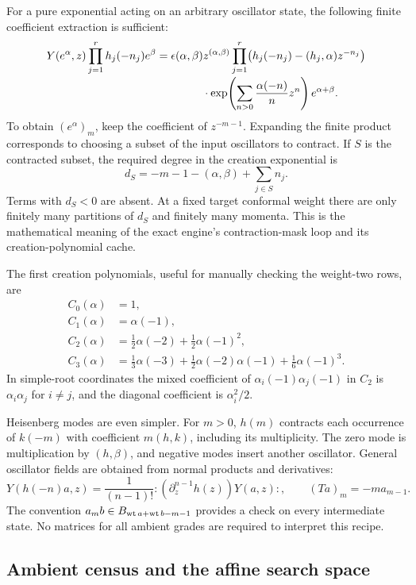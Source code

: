 For a pure exponential acting on an arbitrary oscillator state, the
following finite coefficient extraction is sufficient:
\begin{align}
Y(e^\alpha,z)\prod_{j=1}^r h_j(-n_j)e^\beta
={}&\epsilon(\alpha,\beta)z^{(\alpha,\beta)}
\prod_{j=1}^r\bigl(h_j(-n_j)-(h_j,\alpha)z^{-n_j}\bigr)
\notag\\[-2pt]
&\hspace{10mm}\cdot
\exp\!\left(\sum_{n>0}\frac{\alpha(-n)}n z^n\right)
 e^{\alpha+\beta}.
\label{expfinite:full-vertex-action}
\end{align}
To obtain $(e^\alpha)_m$, keep the coefficient of $z^{-m-1}$.
Expanding the finite product corresponds to choosing a subset of the
input oscillators to contract. If $S$ is the contracted subset, the
required degree in the creation exponential is
\[
 d_S=-m-1-(\alpha,\beta)+\sum_{j\in S}n_j.
\]
Terms with $d_S<0$ are absent. At a fixed target conformal weight there
are only finitely many partitions of $d_S$ and finitely many momenta.
This is the mathematical meaning of the exact engine's contraction-mask
loop and its creation-polynomial cache.

The first creation polynomials, useful for manually checking the
weight-two rows, are
\begin{align*}
C_0(\alpha)&=1,\\
C_1(\alpha)&=\alpha(-1),\\
C_2(\alpha)&=\tfrac12\alpha(-2)+\tfrac12\alpha(-1)^2,\\
C_3(\alpha)&=\tfrac13\alpha(-3)+\tfrac12\alpha(-2)\alpha(-1)
                  +\tfrac16\alpha(-1)^3.
\end{align*}
In simple-root coordinates the mixed coefficient of
$\alpha_i(-1)\alpha_j(-1)$ in $C_2$ is $\alpha_i\alpha_j$ for
$i\ne j$, and the diagonal coefficient is $\alpha_i^2/2$.

Heisenberg modes are even simpler. For $m>0$, $h(m)$ contracts each
occurrence of $k(-m)$ with coefficient $m(h,k)$, including its
multiplicity. The zero mode is multiplication by $(h,\beta)$, and
negative modes insert another oscillator. General oscillator fields
are obtained from normal products and derivatives:
\[
Y(h(-n)a,z)=\frac1{(n-1)!}:
   (\partial_z^{n-1}h(z))Y(a,z):,
\qquad
(Ta)_m=-m a_{m-1}.
\]
The convention $a_mb\in B_{\operatorname{wt} a+\operatorname{wt} b-m-1}$ provides a check on
every intermediate state. No matrices for all ambient grades are
required to interpret this recipe.

\subsection{Ambient census and the affine search space}
\label{expfinite:ambient-census}

